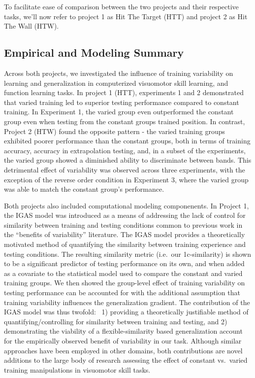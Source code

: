 \documentclass[
  11pt,
  letterpaper,
]{article}
\begin{document}
To facilitate ease of comparison between the two projects and their
respective tasks, we'll now refer to project 1 as Hit The Target (HTT)
and project 2 as Hit The Wall (HTW).

\subsection{Empirical and Modeling
Summary}\label{empirical-and-modeling-summary}

Across both projects, we investigated the influence of training
variability on learning and generalization in computerized visuomotor
skill learning, and function learning tasks. In project 1 (HTT),
experiments 1 and 2 demonstrated that varied training led to superior
testing performance compared to constant training. In Experiment 1, the
varied group even outperformed the constant group even when testing from
the constant groups trained position. In contrast, Project 2 (HTW) found
the opposite pattern - the varied training groups exhibited poorer
performance than the constant groups, both in terms of training
accuracy, accuracy in extrapolation testing, and, in a subset of the
experiments, the varied group showed a diminished ability to
discriminate between bands. This detrimental effect of variability was
observed across three experiments, with the exception of the reverse
order condition in Experiment 3, where the varied group was able to
match the constant group's performance.

Both projects also included computational modeling componenents. In
Project 1, the IGAS model was introduced as a means of addressing the
lack of control for similarity between training and testing conditions
common to previous work in the ``benefits of variability'' literature.
The IGAS model provides a theoretically motivated method of quantifying
the similarity between training experience and testing conditions. The
resulting similarity metric (i.e.~our 1c-similarity) is shown to be a
significant predictor of testing performance on its own, and when added
as a covariate to the statistical model used to compare the constant and
varied training groups. We then showed the group-level effect of
training variability on testing performance can be accounted for with
the additional assumption that training variability influences the
generalization gradient. The contribution of the IGAS model was thus
twofold:~ 1) providing a theoretically justifiable method of
quantifying/controlling for similarity between training and testing, and
2) demonstrating the viability of a flexible-similarity based
generalization account for the empirically observed benefit of
variability in our task. Although similar approaches have been employed
in other domains, both contributions are novel additions to the large
body of research assessing the effect of constant vs.~varied training
manipulations in visuomotor skill tasks.
\end{document}
